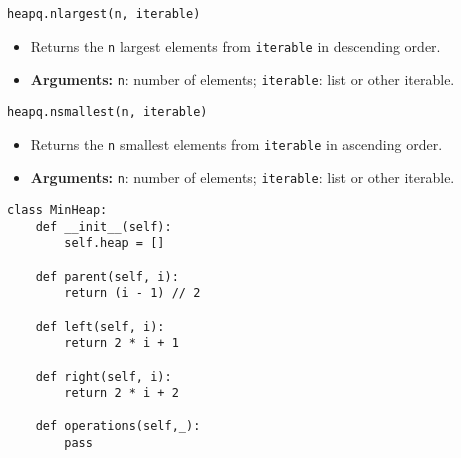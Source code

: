 \begin{summary}
\begin{lstlisting}
heapq.nlargest(n, iterable)
\end{lstlisting}
\begin{itemize}
    \item Returns the \texttt{n} largest elements from \texttt{iterable} in descending order.
    \item \textbf{Arguments:} \texttt{n}: number of elements; \texttt{iterable}: list or other iterable.
\end{itemize}
    
\begin{lstlisting}
heapq.nsmallest(n, iterable)
\end{lstlisting}
\begin{itemize}[noitemsep]
    \item Returns the \texttt{n} smallest elements from \texttt{iterable} in ascending order.
    \item \textbf{Arguments:} \texttt{n}: number of elements; \texttt{iterable}: list or other iterable.
\end{itemize}        
\end{summary}
\newpage

\begin{algo}
\begin{lstlisting}
class MinHeap:
    def __init__(self):
        self.heap = []

    def parent(self, i):
        return (i - 1) // 2

    def left(self, i):
        return 2 * i + 1

    def right(self, i):
        return 2 * i + 2

    def operations(self,_):
        pass
\end{lstlisting}
        
        
\end{algo}
\newpage

